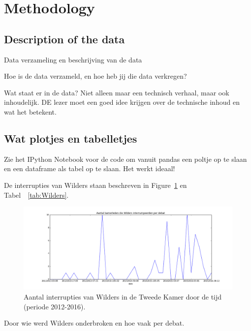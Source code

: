 \section{Methodology}
\label{sec:meth}


\subsection{Description of the data}
Data verzameling en beschrijving van de data

Hoe is de data verzameld, en hoe heb jij die data verkregen?


Wat staat er in de data? Niet alleen maar een technisch verhaal, maar ook inhoudelijk. DE lezer moet een goed idee krijgen over de technische inhoud en wat het betekent.

\pagebreak
\subsection{Wat plotjes en tabelletjes}

Zie het IPython Notebook voor de code om vanuit pandas een poltje op te slaan en een dataframe als tabel op te slaan. Het werkt ideaal! 

De interrupties van Wilders staan beschreven in Figure~\ref{fig:wilders} en Tabel~~\ref{tab:Wilders}.



\begin{figure}
\begin{center}
\includegraphics[width=\linewidth]{fig/WildersPlot.png}
\caption{\label{fig:wilders} Aantal interrupties van Wilders in de Tweede Kamer door de tijd (periode 2012-2016).}
\end{center}
\end{figure}


\pagebreak

\begin{table}[h]
\begin{footnotesize}

\end{footnotesize}
\caption{\label{tab:Wilders} Door wie werd Wilders onderbroken en hoe vaak per debat.}
\end{table}


